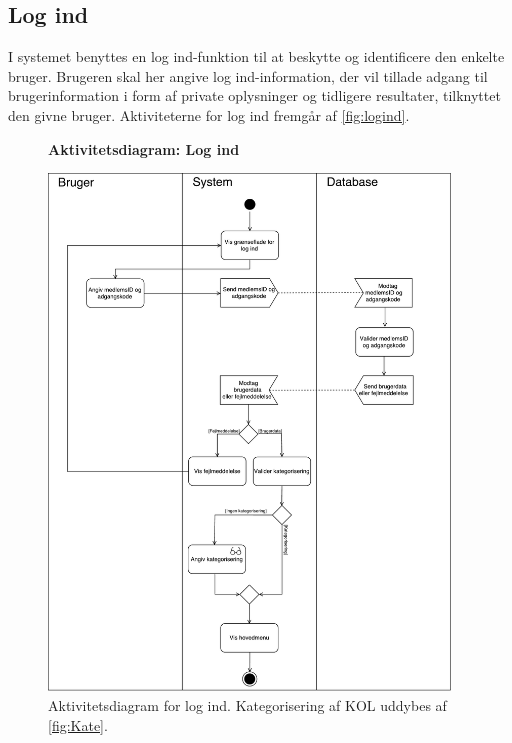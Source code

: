 \newpage
\subsection*{Log ind}
I systemet benyttes en log ind-funktion til at beskytte og identificere den enkelte bruger. Brugeren skal her angive log ind-information, der vil tillade adgang til brugerinformation i form af private oplysninger og tidligere resultater, tilknyttet den givne bruger. Aktiviteterne for log ind fremgår af \autoref{fig:logind}.    

\begin{figure} [H]
\centering
\textbf{Aktivitetsdiagram: Log ind}\par\medskip
\includegraphics[width=0.95\textwidth]{figures/aktivitetsdiagram/Logind}
\caption{Aktivitetsdiagram for log ind. Kategorisering af KOL uddybes af \autoref{fig:Kate}.}
\label{fig:logind}
\end{figure}

